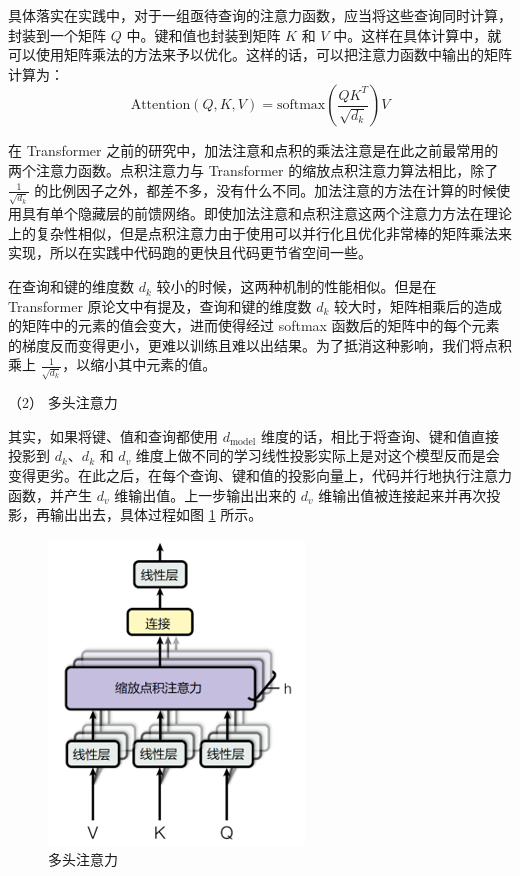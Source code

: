 具体落实在实践中，对于一组亟待查询的注意力函数，应当将这些查询同时计算，封装到一个矩阵 $Q$ 中。键和值也封装到矩阵 $K$ 和 $V$ 中。这样在具体计算中，就可以使用矩阵乘法的方法来予以优化。这样的话，可以把注意力函数中输出的矩阵计算为：
\begin{equation}
\text{Attention}(Q,K,V) = \text{softmax}(\frac{QK^T}{\sqrt{d_k}})V
\label{eq3.1}
\end{equation}

在 Transformer 之前的研究中，加法注意和点积的乘法注意是在此之前最常用的两个注意力函数。点积注意力与 Transformer 的缩放点积注意力算法相比，除了 $\frac{1}{\sqrt{d_k}}$ 的比例因子之外，都差不多，没有什么不同。加法注意的方法在计算的时候使用具有单个隐藏层的前馈网络。即使加法注意和点积注意这两个注意力方法在理论上的复杂性相似，但是点积注意力由于使用可以并行化且优化非常棒的矩阵乘法来实现，所以在实践中代码跑的更快且代码更节省空间一些。

在查询和键的维度数 $d_k$ 较小的时候，这两种机制的性能相似。但是在 Transformer 原论文中有提及，查询和键的维度数 $d_k$ 较大时，矩阵相乘后的造成的矩阵中的元素的值会变大，进而使得经过 softmax 函数后的矩阵中的每个元素的梯度反而变得更小，更难以训练且难以出结果。为了抵消这种影响，我们将点积乘上 $\frac{1}{\sqrt{d_k}}$，以缩小其中元素的值。

（2） 多头注意力

其实，如果将键、值和查询都使用 $d_{\text{model}}$ 维度的话，相比于将查询、键和值直接投影到 $d_k$、$d_k$ 和 $d_v$ 维度上做不同的学习线性投影实际上是对这个模型反而是会变得更劣。在此之后，在每个查询、键和值的投影向量上，代码并行地执行注意力函数，并产生 $d_v$ 维输出值。上一步输出出来的 $d_v$ 维输出值被连接起来并再次投影，再输出出去，具体过程如图 \ref{fig:MultiheadAtt} 所示。

\begin{figure}[htbp]
	\centering
	\includegraphics[scale = 0.8]{figures/MultiheadAtt}
	\caption{多头注意力}
	\label{fig:MultiheadAtt}
\end{figure}

